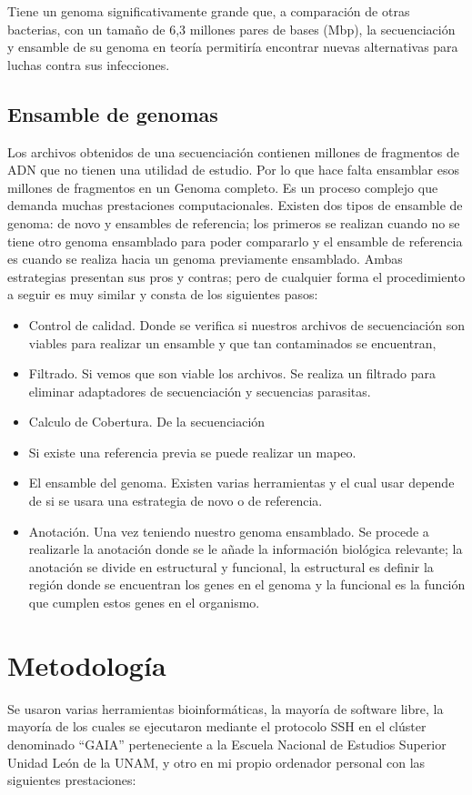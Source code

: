\documentclass[journal, letterpaper, 11pt]{IEEEtran}
\begin{document}
Tiene un genoma significativamente grande que, a comparación de otras bacterias, con un tamaño de 6,3 millones pares de bases (Mbp), la secuenciación y ensamble de su genoma en teoría  permitiría encontrar nuevas alternativas para luchas contra sus infecciones.

\subsection{Ensamble de genomas}
Los archivos obtenidos de una secuenciación contienen millones de fragmentos de ADN que no tienen una utilidad de estudio. Por lo que hace falta ensamblar esos millones de fragmentos en un Genoma completo. Es un proceso complejo que demanda muchas prestaciones computacionales. Existen dos tipos de ensamble de genoma: de novo y ensambles de referencia; los primeros se realizan cuando no se tiene otro genoma ensamblado para poder compararlo y el ensamble de referencia es cuando se realiza hacia un genoma previamente ensamblado. Ambas estrategias presentan sus pros y contras; pero de cualquier forma el procedimiento a seguir es muy similar y consta de los siguientes pasos:

\begin{itemize}
\item Control de calidad. Donde se verifica si nuestros archivos de secuenciación son viables para realizar un ensamble y que tan contaminados se encuentran,
\item Filtrado. Si vemos que son viable los archivos. Se realiza un filtrado para eliminar adaptadores de secuenciación y secuencias parasitas.
\item Calculo de Cobertura. De la secuenciación
\item Si existe una referencia previa se puede realizar un mapeo.
\item El ensamble del genoma. Existen varias herramientas y el cual usar depende de si se usara una estrategia de novo o de referencia.
\item Anotación. Una vez teniendo nuestro genoma ensamblado. Se procede a realizarle la anotación donde se le añade la información biológica relevante; la anotación se divide en estructural y funcional, la estructural es definir la región donde se encuentran los genes en el genoma y la funcional es la función que cumplen estos genes en el organismo.
\end{itemize}

\section{Metodología}
Se usaron varias herramientas bioinformáticas, la mayoría de software libre, la mayoría de los cuales se ejecutaron mediante el protocolo SSH en el clúster denominado “GAIA” perteneciente a la Escuela Nacional de Estudios Superior Unidad León de la UNAM, y otro en mi propio ordenador personal con las siguientes prestaciones:
\end{document}

